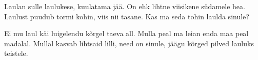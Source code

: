 Laulan sulle laulukese, kuulatama j\"a\"a.
On ehk lihtne viisikene s\"udamele hea.
Laulust puudub tormi kohin, viis nii tasane.
Kas ma seda tohin laulda sinule?

Ei mu laul k\"ai luigelendu k\~orgel taeva all.
Mulla peal ma leian enda maa peal madalal.
Mullal kasvab lihtsaid lilli, need on sinule,
j\"a\"agu k\~orged pilved lauluks teistele.

